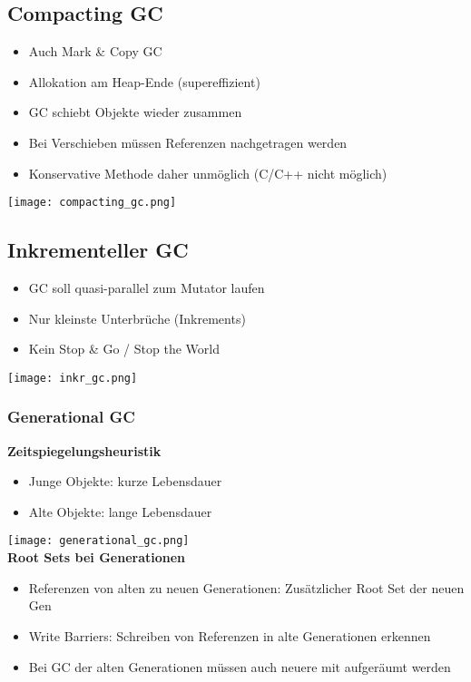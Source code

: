 \subsection{Compacting GC}
\begin{itemize}
    \item Auch Mark \& Copy GC
    \item Allokation am Heap-Ende (supereffizient)
    \item GC schiebt Objekte wieder zusammen
    \item Bei Verschieben müssen Referenzen nachgetragen werden
    \item Konservative Methode daher unmöglich (C/C++ nicht möglich)
\end{itemize}
\texttt{[image: compacting\_gc.png]}

\subsection{Inkrementeller GC}
\begin{itemize}
    \item GC soll quasi-parallel zum Mutator laufen
    \item Nur kleinste Unterbrüche (Inkrements)
    \item Kein Stop \& Go / Stop the World
\end{itemize}
\texttt{[image: inkr\_gc.png]}
\subsubsection{Generational GC}
\textbf{Zeitspiegelungsheuristik}
\begin{itemize}
    \item Junge Objekte: kurze Lebensdauer
    \item Alte Objekte: lange Lebensdauer
\end{itemize}
\texttt{[image: generational\_gc.png]}\\
\textbf{Root Sets bei Generationen}
\begin{itemize}
    \item Referenzen von alten zu neuen Generationen: Zusätzlicher Root Set der neuen Gen
    \item Write Barriers: Schreiben von Referenzen in alte Generationen erkennen
    \item Bei GC der alten Generationen müssen auch neuere mit aufgeräumt werden
\end{itemize}

